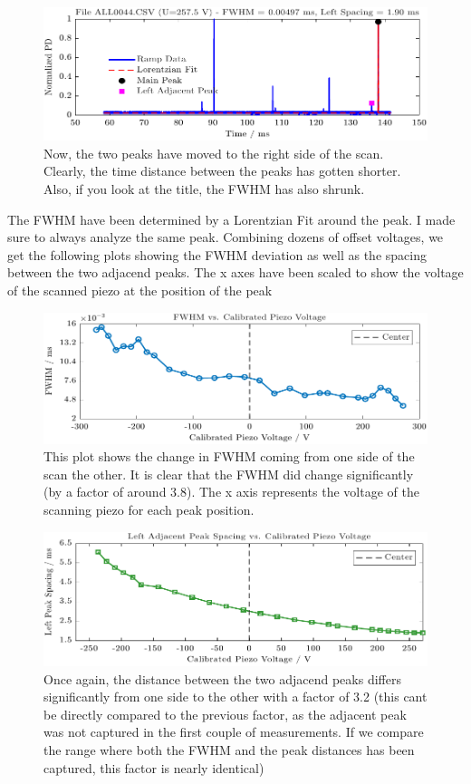 \documentclass[a4paper,11pt]{article}
\begin{document}
\begin{figure}[H]
    \centering
    \includegraphics[width=\textwidth]{fwhm/Figure_2.pdf}
    \caption{Now, the two peaks have moved to the right side of the scan. Clearly, the time distance between the peaks has gotten shorter. Also, if you look at the title, the FWHM has also shrunk.}
\end{figure}

The FWHM have been determined by a Lorentzian Fit around the peak. I made sure to always analyze the same peak. Combining dozens of offset voltages, we get the following plots showing the FWHM deviation as well as the spacing between the two adjacend peaks. The x axes have been scaled to show the voltage of the scanned piezo at the position of the peak


\begin{figure}[H]
    \centering
    \includegraphics[width=\textwidth]{fwhm/Figure_3.pdf}
    \caption{This plot shows the change in FWHM coming from one side of the scan the other. It is clear that the FWHM did change significantly (by a factor of around 3.8). The x axis represents the voltage of the scanning piezo for each peak position.}
\end{figure}


\begin{figure}[H]
    \centering
    \includegraphics[width=\textwidth]{fwhm/Figure_4.pdf}
    \caption{Once again, the distance between the two adjacend peaks differs significantly from one side to the other with a factor of 3.2 (this cant be directly compared to the previous factor, as the adjacent peak was not captured in the first couple of measurements. If we compare the range where both the FWHM and the peak distances has been captured, this factor is nearly identical)}
\end{figure}
\end{document}

